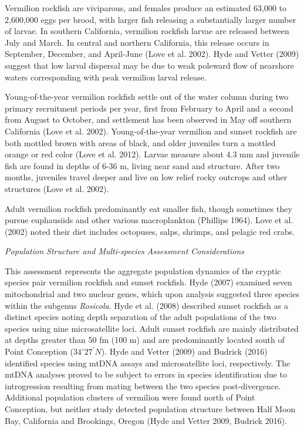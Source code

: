 \documentclass[
  english,
  a4paper,
]{article}
\begin{document}
Vermilion rockfish are viviparous, and females produce an estimated 63,000 to 2,600,000 eggs per brood, with larger fish releasing a substantially larger number of larvae.
In southern California, vermilion rockfish larvae are released between July and March.
In central and northern California, this release occurs in September, December, and
April-June (Love et al. 2002). Hyde and Vetter (2009) suggest that low larval dispersal may
be due to weak poleward flow of nearshore waters corresponding with peak vermilion larval release.

Young-of-the-year vermilion rockfish settle out of the water column during two primary recruitment
periods per year, first from February to April and a second from August to October,
and settlement has been observed in May off southern California (Love et al. 2002). Young-of-the-year vermilion and sunset rockfish are both mottled brown with areas of black, and older juveniles turn a mottled orange or red color (Love et al. 2012). Larvae
measure about 4.3 mm and juvenile fish are found in depths of 6-36 m, living near sand and structure. After two months, juveniles travel deeper and live on low relief rocky outcrops and
other structures (Love et al. 2002).

Adult vermilion rockfish predominantly eat smaller fish, though sometimes they pursue
euphausiids and other various macroplankton (Phillips 1964). Love et al. (2002) noted
their diet includes octopuses, salps, shrimps, and pelagic red crabs.

\emph{Population Structure and Multi-species Assessment Considerations}

This assessment represents the aggregate population dynamics of the cryptic species pair vermilion rockfish
and sunset rockfish.
Hyde (2007) examined seven mitochondrial and two nuclear genes, which upon analysis suggested
three species within the subgenus \emph{Rosicola}. Hyde et al. (2008) described sunset rockfish as a distinct species noting depth separation
of the adult populations of the two species using nine microsatellite loci.
Adult sunset rockfish are mainly distributed at depths
greater than 50 fm (100 m) and are predominantly located south of Point Conception ($34^\circ 27^\prime N$).
Hyde and Vetter (2009) and Budrick (2016) identified species using mtDNA assays and microsatellite loci,
respectively. The mtDNA analyses proved to be subject to errors in species identification due to introgression resulting from mating between the two species post-divergence.
Additional population clusters of vermilion were found north of Point Conception, but neither
study detected population structure between Half Moon Bay, California and Brookings,
Oregon (Hyde and Vetter 2009, Budrick 2016).
\end{document}
